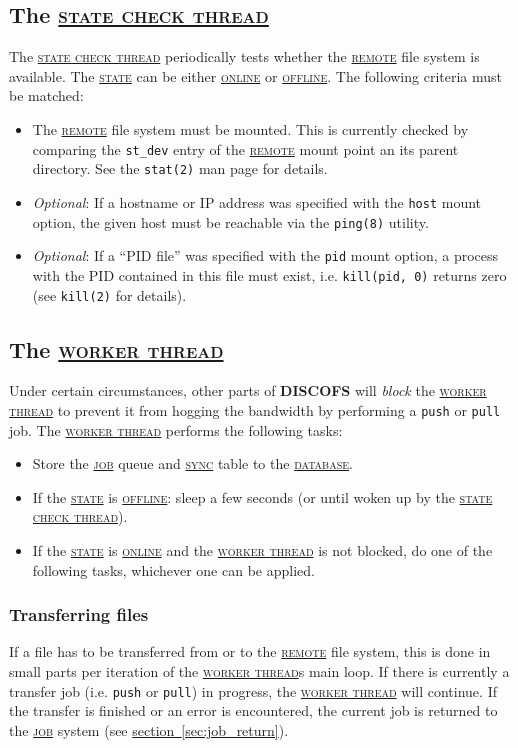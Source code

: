 \documentclass[a4paper]{article}
\newcommand{\software}[1]{\textsc{\textbf{#1}}\xspace}
\newcommand{\discofs}{\software{DISCOFS}}
\newcommand{\component}[1]{\hyperref[comp:#1]{\textsc{#1}}\xspace}
\newcommand{\job}{\component{job}}
\newcommand{\jobtype}[1]{\texttt{#1}\xspace}
\newcommand{\push}{\jobtype{push}}
\newcommand{\pull}{\jobtype{pull}}
\newcommand{\sync}{\component{sync}}
\newcommand{\remote}{\component{remote}}
\newcommand{\database}{\component{database}}
\newcommand{\state}{\component{state}}
\newcommand{\online}{\component{online}}
\newcommand{\offline}{\component{offline}}
\newcommand{\workerthread}{\hyperref[comp:workerthread]{\textsc{worker thread}}\xspace}
\newcommand{\statecheckthread}{\hyperref[comp:statecheckthread]{\textsc{state check thread}}\xspace}
\newcommand{\sectionref}[1]{\hyperref[#1]{section~\ref{#1}}}
\begin{document}
\subsection{The \statecheckthread} %
\label{comp:statecheckthread}
The \statecheckthread periodically tests whether the \remote file system is
available. The \state can be either \online or \offline. The following criteria
must be matched:
\begin{itemize}
	\item The \remote file system must be mounted. This is currently checked by
		comparing the \texttt{st_dev} entry of the \remote mount point an its
		parent directory. See the \texttt{stat(2)} man page for details.

	\item \emph{Optional}: If a hostname or IP address was specified with the
		\texttt{host} mount option, the given host must be reachable via the 
		\texttt{ping(8)} utility.

	\item \emph{Optional}: If a ``PID file'' was specified with the \texttt{pid}
		mount option, a process with the PID contained in this file must exist,
		i.e. \texttt{kill(pid,~0)} returns zero (see \texttt{kill(2)} for
		details).
\end{itemize}

\subsection{The \workerthread} %
\label{comp:workerthread}
Under certain circumstances, other parts of \discofs will \emph{block} the
\workerthread to prevent it from hogging the bandwidth by performing a
\push or \pull job.
The \workerthread performs the following tasks:

\begin{itemize}
	\item Store the \job queue and \sync table to the \database.
	\item If the \state is \offline: sleep a few seconds (or until woken up by
		the \statecheckthread).
	\item If the \state is \online and the \workerthread is not blocked, do one
			of the following tasks, whichever one can be applied.
\end{itemize}


\subsubsection{Transferring files} %
\label{sec:worker_transfer}
If a file has to be transferred from or to the \remote file system, this is done
in small parts per iteration of the \workerthread{}s main loop. If there is
currently a transfer job (i.e. \push or \pull) in progress, the
\workerthread will continue. If the transfer is finished or an error is
encountered, the current job is returned to the \job system (see
\sectionref{sec:job_return}).
\end{document}
